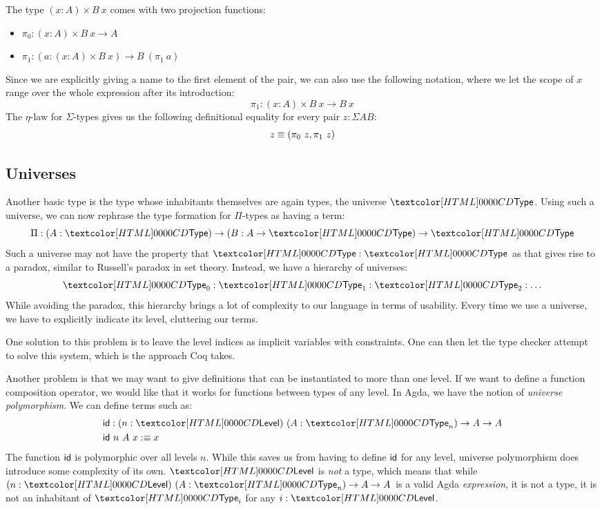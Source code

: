 The type $(x : A) \times B\ x$ comes with two projection functions:
\begin{itemize}
\item $\pi_0 : (x : A) \times B\ x \to A$
\item $\pi_1 : (a : (x : A) \times B\ x) \to B\ (\pi_1\ a)$
\end{itemize}
Since we are explicitly giving a name to the first element of the
pair, we can also use the following notation, where we let the scope
of $x$ range over the whole expression after its introduction:
$$
\pi_1 : (x : A) \times B\ x \to B\ x
$$
The $\eta$-law for $\Sigma$-types gives us the following definitional
equality for every pair $z : \Sigma A B$:
$$
z \equiv (\pi_0\ z , \pi_1\ z)
$$

\subsection{Universes}

Another basic type is the type whose inhabitants themselves are again
types, the universe $\Type$. Using such a universe, we can now
rephrase the type formation for $\Pi$-types as having a term:
$$
\Pi : (A : \Type) \to (B : A \to \Type) \to \Type
$$
Such a universe may not have the property that $\Type : \Type$ as that
gives rise to a paradox, similar to Russell's paradox in set
theory. Instead, we have a hierarchy of universes:
$$
\Type_0 : \Type_1 : \Type_2 : \hdots
$$
While avoiding the paradox, this hierarchy brings a lot of complexity
to our language in terms of usability. Every time we use a universe,
we have to explicitly indicate its level, cluttering our terms.

One solution to this problem is to leave the level indices as implicit
variables with constraints. One can then let the type checker attempt
to solve this system, which is the approach Coq takes. 

Another problem is that we may want to give definitions that can be
instantiated to more than one level. If we want to define a function
composition operator, we would like that it works for functions
between types of any level. In Agda, we have the notion of
\emph{universe polymorphism}. We can define terms such as:
\begin{align*}
  &\id : (n : \Level)\ (A : \Type_n) \to A \to A \\
  &\id\ n\ A\ x \ddefeq x
\end{align*}
The function $\id$ is polymorphic over all levels $n$. While this
saves us from having to define $\id$ for any level, universe
polymorphism does introduce some complexity of its own. $\Level$ is
\emph{not} a type, which means that while
$(n : \Level)\ (A : \Type_n) \to A \to A$ is a valid Agda
\emph{expression}, it is not a type, \ie it is not an inhabitant of
$\Type_i$ for any $i : \Level$.

